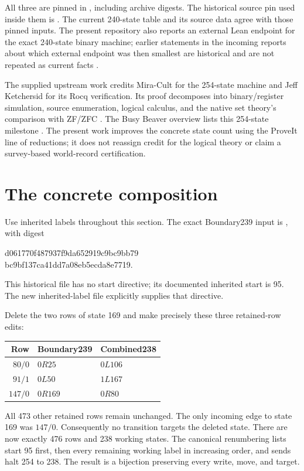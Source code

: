 All three are pinned in , including archive digests.
The historical source pin used inside them is
. The current
240-state table and its source data agree with those pinned inputs.
The present repository also reports an external Lean endpoint for the
exact 240-state binary machine; earlier statements in the incoming
reports about which external endpoint was then smallest are historical
and are not repeated as current facts \cite{rotation240,calibration}.

The supplied upstream work credits Mira-Cult for the 254-state machine
and Jeff Ketchersid for its Rocq verification. Its proof decomposes into
binary/register simulation, source enumeration, logical calculus, and
the native set theory's comparison with ZF/ZFC \cite{upstream}.
The Busy Beaver overview lists this 254-state milestone
\cite{bbwiki}. The present work improves the concrete state count using
the ProveIt line of reductions; it does not reassign credit for the
logical theory or claim a survey-based world-record certification.

\section{The concrete composition}
\label{sec:construction}

Use inherited labels throughout this section. The exact Boundary239
input is , with digest
\begin{center}\small\ttfamily
d061770f487937f9da652919c9bc9bb79\\
bc9bf137ca41dd7a08eb5ecda8e7719.
\end{center}
This historical file has no start directive; its documented inherited
start is 95. The new inherited-label file explicitly supplies that
directive.

Delete the two rows of state 169 and make precisely these three
retained-row edits:
\begin{center}
\begin{tabular}{@{}rll@{}}
\toprule
Row & Boundary239 & Combined238\\
\midrule
$80/0$ & $0R25$ & $0L106$\\
$91/1$ & $0L50$ & $1L167$\\
$147/0$ & $0R169$ & $0R80$\\
\bottomrule
\end{tabular}
\end{center}
All 473 other retained rows remain unchanged. The only incoming edge
to state 169 was $147/0$. Consequently no transition targets the
deleted state. There are now exactly 476 rows and 238 working states.
The canonical renumbering lists start 95 first, then every remaining
working label in increasing order, and sends halt 254 to 238.
The result is a bijection preserving every write, move, and target.

